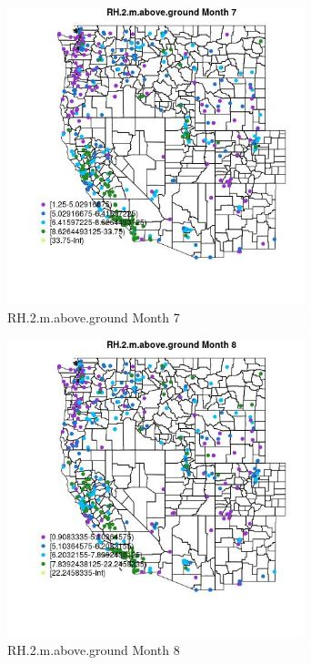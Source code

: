 \begin{figure} 
\centering  
\includegraphics[width=0.77\textwidth]{Code_Outputs/ML_input_report_ML_input_PM25_Step5_part_d_de_duplicated_aves_ML_input_MapObsMo7RH2maboveground.jpg} 
\caption{\label{fig:ML_input_report_ML_input_PM25_Step5_part_d_de_duplicated_aves_ML_inputMapObsMo7RH2maboveground}RH.2.m.above.ground Month 7} 
\end{figure} 
 

\begin{figure} 
\centering  
\includegraphics[width=0.77\textwidth]{Code_Outputs/ML_input_report_ML_input_PM25_Step5_part_d_de_duplicated_aves_ML_input_MapObsMo8RH2maboveground.jpg} 
\caption{\label{fig:ML_input_report_ML_input_PM25_Step5_part_d_de_duplicated_aves_ML_inputMapObsMo8RH2maboveground}RH.2.m.above.ground Month 8} 
\end{figure} 
 

